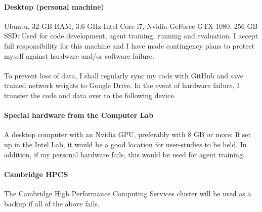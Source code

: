 \documentclass[12pt,a4paper]{book}
\begin{document}
\paragraph{Desktop (personal machine)} Ubuntu, 32 GB RAM, 3.6 GHz Intel Core i7, Nvidia GeForce GTX 1080, 256 GB SSD: Used for code development, agent training, running and evaluation. I accept full responsibility for this machine and I have made contingency plans to protect myself against hardware and/or software failure.

\paragraph{}To prevent loss of data, I shall regularly sync my code with GitHub and save trained network weights to Google Drive. In the event of hardware failure, I transfer the code and data over to the following device.

\paragraph{Special hardware from the Computer Lab} A desktop computer with an Nvidia GPU, preferably with 8 GB or more: If set up in the Intel Lab, it would be a good location for user-studies to be held. In addition, if my personal hardware fails, this would be used for agent training.

\paragraph{Cambridge HPCS} The Cambridge High Performance Computing Services cluster will be used as a backup if all of the above fails.
\end{document}
